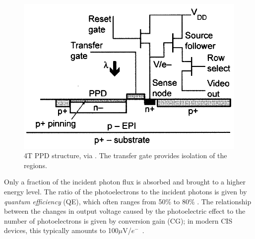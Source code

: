 \begin{figure}[h]
  \centering
  \includegraphics[width=\linewidth]{imgs/sensors/4tppd.png}
  \caption{4T PPD structure, via \cite{Holst2011}. The transfer gate provides isolation of the regions.}
  \label{fig:4tccd}
\end{figure}

Only a fraction of the incident photon flux is absorbed and brought to a higher energy level. The ratio of the photoelectrons to the incident photons is given by \textit{quantum efficiency} (QE), which often ranges from 50\% to 80\% \cite{9059308}.
The relationship between the changes in output voltage caused by the photoelectric effect to the number of photoelectrons is given by conversion gain (CG); in modern CIS devices, this typically amounts to 100$\mu$V/$e^{-}$~\cite{7006672}. 
